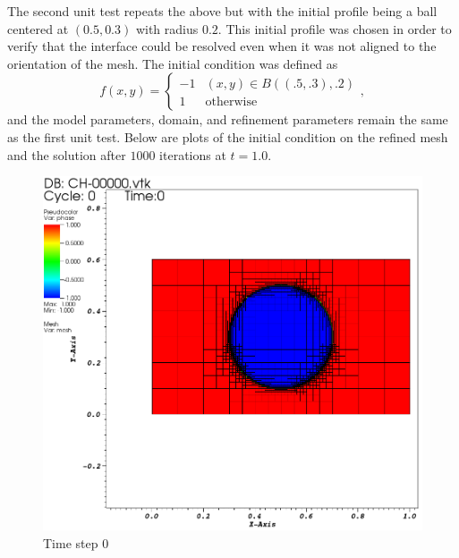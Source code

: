 \documentclass[11pt,fullpage]{article}
\theoremstyle{lemma}
\theoremstyle{definition}
\theoremstyle{lemma}
\begin{document}
The second unit test repeats the above but with the initial profile being a ball centered at $(0.5, 0.3)$ with radius $0.2$. This initial profile was chosen in order to verify that the interface could be resolved even when it was not aligned to the orientation of the mesh. The initial condition was defined as
$$
f(x, y) = \begin{cases}
-1 & (x,y)\in B((.5, .3), .2)\\
1 & \text{otherwise}
\end{cases},
$$
and the model parameters, domain, and refinement parameters remain the same as the first unit test. Below are plots of the initial condition on the refined mesh and the solution after $1000$ iterations at $t=1.0$.
\begin{figure}[ht!]
	\begin{minipage}{.4\paperwidth}
		\centering
		\includegraphics[scale=.9]{CHBall1.png}
		\\Time step 0
	\end{minipage}%
	\begin{minipage}{.4\paperwidth}
		\centering

\end{minipage}
\end{figure}
\end{document}
